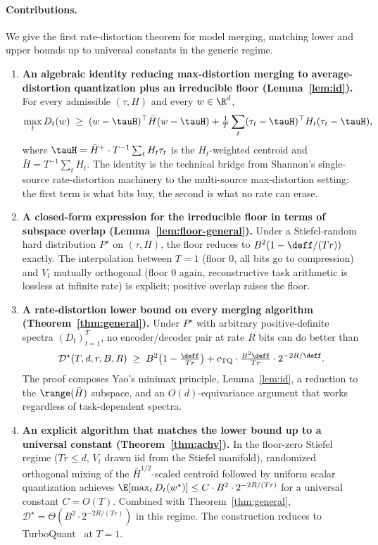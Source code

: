 \paragraph{Contributions.} We give the first rate-distortion
theorem for model merging, matching lower and upper bounds up
to universal constants in the generic regime.

\begin{enumerate}[leftmargin=*,topsep=2pt,itemsep=2pt]
\item \textbf{An algebraic identity reducing max-distortion
merging to average-distortion quantization plus an irreducible
floor (Lemma~\ref{lem:id}).} For every admissible $(\tau,H)$
and every $w\in\R^d$,
\[
\max_t D_t(w)\;\geq\; (w-\tauH)^\top\bar H(w-\tauH)
+ \tfrac{1}{T}\sum_t (\tau_t-\tauH)^\top H_t(\tau_t-\tauH),
\]
where $\tauH = \bar H^+\cdot T^{-1}\sum_t H_t\tau_t$ is the
$H_t$-weighted centroid and $\bar H = T^{-1}\sum_t H_t$. The
identity is the technical bridge from Shannon's single-source
rate-distortion machinery to the multi-source max-distortion
setting: the first term is what bits buy, the second is what
no rate can erase.

\item \textbf{A closed-form expression for the irreducible
floor in terms of subspace overlap (Lemma~\ref{lem:floor-general}).}
Under a Stiefel-random hard distribution $P^\star$ on
$(\tau, H)$, the floor reduces to $B^2(1 - \deff/(Tr))$
exactly. The interpolation between $T=1$ (floor $0$, all bits
go to compression) and $V_t$ mutually orthogonal (floor $0$
again, reconstructive task arithmetic is lossless at infinite
rate) is explicit; positive overlap raises the floor.

\item \textbf{A rate-distortion lower bound on every merging
algorithm (Theorem~\ref{thm:general}).} Under $P^\star$ with
arbitrary positive-definite spectra $(D_t)_{t=1}^T$, no
encoder/decoder pair at rate $R$ bits can do better than
\begin{equation*}
\mathcal{D}^\star(T,d,r,B,R)\;\geq\;
B^2\!\left(1 - \tfrac{\deff}{Tr}\right) +
c_{\mathrm{TQ}}\cdot\tfrac{B^2\deff}{Tr}\cdot 2^{-2R/\deff}.
\end{equation*}
The proof composes Yao's minimax principle, Lemma~\ref{lem:id},
a reduction to the $\range(\bar H)$ subspace, and an
$O(d)$-equivariance argument that works regardless of
task-dependent spectra.

\item \textbf{An explicit algorithm that matches the lower
bound up to a universal constant (Theorem~\ref{thm:achv}).}
In the floor-zero Stiefel regime ($Tr\leq d$, $V_t$ drawn iid
from the Stiefel manifold), randomized orthogonal mixing of the
$\bar H^{1/2}$-scaled centroid followed by uniform scalar
quantization achieves
$\E[\max_t D_t(w^\star)]\leq C\cdot B^2\cdot 2^{-2R/(Tr)}$
for a universal constant $C = O(T)$. Combined with
Theorem~\ref{thm:general},
$\mathcal{D}^\star = \Theta\!\left(B^2\cdot 2^{-2R/(Tr)}\right)$
in this regime. The construction reduces to
TurboQuant~\cite{zandieh2025turboquant} at $T=1$.


\end{enumerate}
